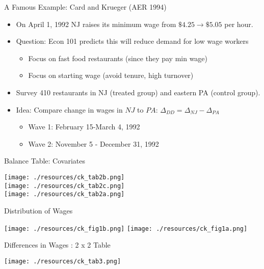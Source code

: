 \begin{frame}{A Famous Example: Card and Krueger (AER 1994)}
\begin{itemize}
\item On April 1, 1992 NJ raises its minimum wage from $\$4.25\rightarrow \$5.05$ per hour.
\item Question: Econ 101 predicts this will \alert{reduce demand for low wage workers}
\begin{itemize}
\item Focus on fast food restaurants (since they pay min wage)
\item Focus on starting wage (avoid tenure, high turnover)
\end{itemize}
\item Survey 410 restaurants in NJ (treated group) and eastern PA (control group).
\item Idea: Compare \alert{change} in wages in $NJ$ to $PA$:  $\Delta_{DD} = \Delta_{NJ}- \Delta_{PA}$
\begin{itemize}
\item Wave 1: February 15-March 4, 1992
\item Wave 2: November 5 - December 31, 1992
\end{itemize}
\end{itemize}
\end{frame}

\begin{frame}{Balance Table: Covariates}
\begin{center}
\texttt{[image: ./resources/ck\_tab2b.png]}\\
\texttt{[image: ./resources/ck\_tab2c.png]}\\
\texttt{[image: ./resources/ck\_tab2a.png]}
\end{center}
\end{frame}



\begin{frame}{Distribution of Wages}
\begin{center}
\texttt{[image: ./resources/ck\_fig1b.png]}
\texttt{[image: ./resources/ck\_fig1a.png]}
\end{center}
\end{frame}


\begin{frame}{Differences in Wages : 2 x 2 Table}
\begin{center}
\texttt{[image: ./resources/ck\_tab3.png]}
\end{center}
\end{frame}

